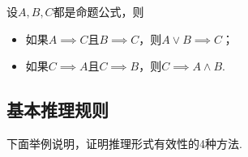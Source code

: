 \begin{theorem}
设\(A,B,C\)都是命题公式，则\begin{itemize}
	\item 如果\(A \implies C\)且\(B \implies C\)，则\(A \lor B \implies C\)；
	\item 如果\(C \implies A\)且\(C \implies B\)，则\(C \implies A \land B\).
\end{itemize}
\end{theorem}


\subsection{基本推理规则}
下面举例说明，证明推理形式有效性的4种方法.

